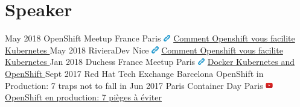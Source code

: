 \documentclass[]{friggeri-cv}
\begin{document}
\section{Speaker}  
\setlength{\parsepsave}{\parsep}%
\setlength{\parsep}{3pt}%
	\begin{entrylist}	
		\entrySpeaker
		{May 2018}
		{OpenShift Meetup France}
		{Paris}
		{ {\includegraphics[width=0.3cm]{img/link.png}} \href{https://www.meetup.com/fr-FR/OpenShift-France/events/250776251/} { Comment Openshift vous facilite Kubernetes }}
		\entrySpeaker
		{May 2018}
		{RivieraDev}
		{Nice}
		{ {\includegraphics[width=0.3cm]{img/link.png}} \href{https://2018.rivieradev.fr/session/370}
		{Comment Openshift vous facilite Kubernetes }}		
		\entrySpeaker
		{Jan 2018 }
		{Duchess France Meetup}
		{Paris}
	 	{ {\includegraphics[width=0.3cm]{img/link.png}}
		 	\href{https://www.duchess-france.org/soiree-docker-kubernetes-openshift-eloise-faure/} { Docker Kubernetes and OpenShift }}
		\entrySpeaker
		{Sept 2017}
		{Red Hat Tech Exchange}
		{Barcelona}
		{OpenShift in Production: 7 traps not to fall in}	
		\entrySpeaker
		{Jun 2017}
		{Paris Container Day}
		{Paris}
		 {  {\includegraphics[width=0.3cm]{img/youtube.png}} \href{https://www.youtube.com/watch?v=zK2oqZhhPSI} { OpenShift en production: 7 pièges à éviter } }		
	\end{entrylist}
\end{document}
